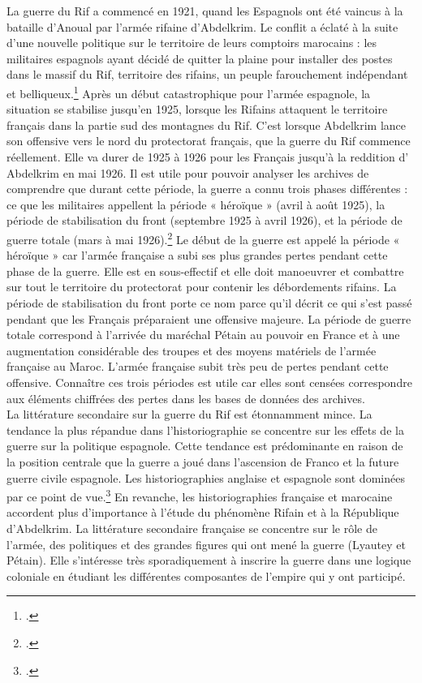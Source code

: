 La guerre du Rif a commencé en 1921, quand les Espagnols ont été vaincus à la bataille d’Anoual par l’armée rifaine d’Abdelkrim. Le conflit a éclaté à la suite d’une nouvelle politique sur  le territoire de leurs comptoirs marocains : les militaires espagnols ayant décidé de quitter la plaine pour installer des postes dans le massif du Rif, territoire des rifains, un peuple farouchement indépendant et belliqueux.\footcites[32]{ayache1996} Après un début catastrophique pour l’armée espagnole, la situation se stabilise  jusqu'en 1925, lorsque les Rifains attaquent le territoire français dans la partie sud des montagnes du Rif. C’est lorsque Abdelkrim lance son offensive vers le nord du protectorat français, que la guerre du Rif commence réellement. Elle va durer de 1925 à 1926 pour les Français jusqu’à la reddition d' Abdelkrim en mai 1926. Il est utile pour pouvoir analyser  les archives de comprendre que durant  cette période, la guerre a connu trois phases  différentes : ce que les militaires appellent la période « héroïque » (avril à août 1925), la période de stabilisation du front (septembre 1925 à avril 1926), et la période de guerre totale (mars à mai 1926).\footcites[79]{schiavon2016} Le début de la guerre est appelé la période « héroïque » car l’armée française a subi ses plus grandes pertes pendant cette phase de la guerre. Elle est en sous-effectif et elle doit  manoeuvrer et combattre sur tout le territoire du protectorat pour contenir les débordements rifains. La période de stabilisation du front porte ce nom parce qu’il décrit ce qui s’est passé pendant que les Français préparaient une offensive majeure. La période de guerre totale correspond à l'arrivée du maréchal Pétain au pouvoir en France et à une augmentation considérable des troupes et des moyens matériels de l’armée française au Maroc. L’armée française subit très peu de pertes pendant cette offensive. Connaître ces trois périodes est utile car elles sont censées correspondre aux éléments chiffrées des pertes dans les bases de données des archives. \\


La littérature secondaire sur la guerre du Rif est étonnamment mince. La tendance la plus répandue dans  l’historiographie se concentre sur les effets de la guerre sur la politique espagnole. Cette tendance est prédominante en raison  de la position centrale que la guerre a joué dans l'ascension de Franco et la future guerre civile espagnole. Les historiographies anglaise et espagnole sont dominées par ce point de vue.\footcites{harris1925} En revanche, les historiographies  française et marocaine accordent plus d'importance  à l’étude du phénomène Rifain et à la République d’Abdelkrim. La littérature secondaire française se concentre sur le rôle de l’armée, des politiques et des grandes figures qui ont mené  la guerre (Lyautey et Pétain). Elle s'intéresse très sporadiquement à inscrire la guerre dans une logique coloniale en étudiant les différentes composantes de l’empire qui y ont participé. \\


